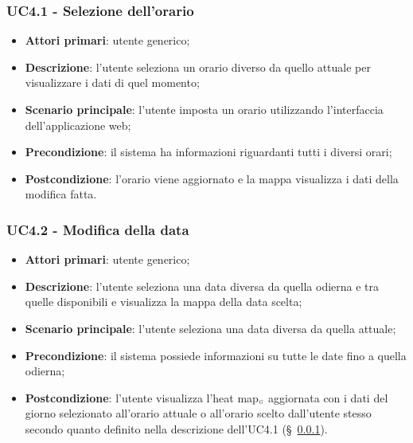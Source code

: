 \subsubsection{UC4.1 - Selezione dell’orario}\label{selezioneOrario}
\begin{itemize}
	\item \textbf{Attori primari}: utente generico;
	\item \textbf{Descrizione}: l’utente seleziona un orario diverso da quello attuale per visualizzare i dati di quel momento;
	\item \textbf{Scenario principale}: l’utente imposta un orario utilizzando l’interfaccia dell’applicazione web;
	\item \textbf{Precondizione}: il sistema ha informazioni riguardanti tutti i diversi orari; %
	\item \textbf{Postcondizione}:  l’orario viene aggiornato e la mappa visualizza i dati della modifica fatta.
\end{itemize}

\subsubsection{UC4.2 - Modifica della data}\label{modificaData}
\begin{itemize}
	\item \textbf{Attori primari}: utente generico;
	\item \textbf{Descrizione}: l’utente seleziona una data diversa da quella odierna e tra quelle disponibili e visualizza la mappa della data scelta;
	\item \textbf{Scenario principale}: l’utente seleziona una data diversa da quella attuale;
	\item \textbf{Precondizione}: il sistema possiede informazioni su tutte le date fino a quella odierna;
	\item \textbf{Postcondizione}: l’utente visualizza l’heat map$_{\scaleto{G}{3pt}}$ aggiornata con i dati del giorno selezionato all’orario attuale o all’orario scelto dall’utente stesso secondo quanto definito nella descrizione dell’UC4.1 (\S~\ref{selezioneOrario}).
\end{itemize}

